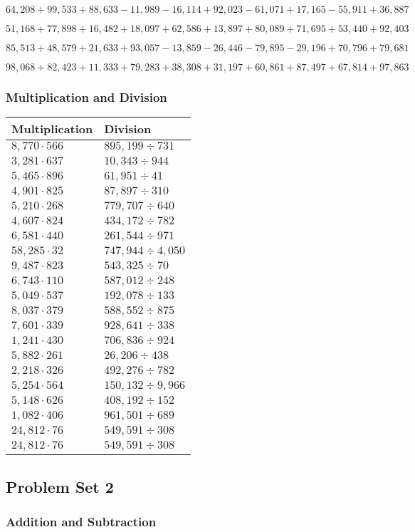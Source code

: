 \(64,208+99,533+88,633-11,989-16,114+92,023-61,071+17,165-55,911+36,887\)

\(51,168+77,898+16,482+18,097+62,586+13,897+80,089+71,695+53,440+92,403\)

\(85,513+48,579+21,633+93,057-13,859-26,446-79,895-29,196+70,796+79,681\)

\(98,068+82,423+11,333+79,283+38,308+31,197+60,861+87,497+67,814+97,863\)

\hypertarget{multiplication-and-division-222}{%
\subsubsection{Multiplication and
Division}\label{multiplication-and-division-222}}

\begin{longtable}[]{@{}ll@{}}
\toprule
Multiplication & Division\tabularnewline
\midrule
\endhead
\(8,770\cdot566\) & \(895,199÷731\)\tabularnewline
\(3,281\cdot637\) & \(10,343÷944\)\tabularnewline
\(5,465\cdot896\) & \(61,951÷41\)\tabularnewline
\(4,901\cdot825\) & \(87,897÷310\)\tabularnewline
\(5,210\cdot268\) & \(779,707÷640\)\tabularnewline
\(4,607\cdot824\) & \(434,172÷782\)\tabularnewline
\(6,581\cdot440\) & \(261,544÷971\)\tabularnewline
\(58,285\cdot32\) & \(747,944÷4,050\)\tabularnewline
\(9,487\cdot823\) & \(543,325÷70\)\tabularnewline
\(6,743\cdot110\) & \(587,012÷248\)\tabularnewline
\(5,049\cdot537\) & \(192,078÷133\)\tabularnewline
\(8,037\cdot379\) & \(588,552÷875\)\tabularnewline
\(7,601\cdot339\) & \(928,641÷338\)\tabularnewline
\(1,241\cdot430\) & \(706,836÷924\)\tabularnewline
\(5,882\cdot261\) & \(26,206÷438\)\tabularnewline
\(2,218\cdot326\) & \(492,276÷782\)\tabularnewline
\(5,254\cdot564\) & \(150,132÷9,966\)\tabularnewline
\(5,148\cdot626\) & \(408,192÷152\)\tabularnewline
\(1,082\cdot406\) & \(961,501÷689\)\tabularnewline
\(24,812\cdot76\) & \(549,591÷308\)\tabularnewline
\(24,812\cdot76\) & \(549,591÷308\)\tabularnewline
\bottomrule
\end{longtable}

\hypertarget{problem-set-2-4}{%
\subsection{Problem Set 2}\label{problem-set-2-4}}

\hypertarget{addition-and-subtraction-224}{%
\subsubsection{Addition and
Subtraction}\label{addition-and-subtraction-224}}

